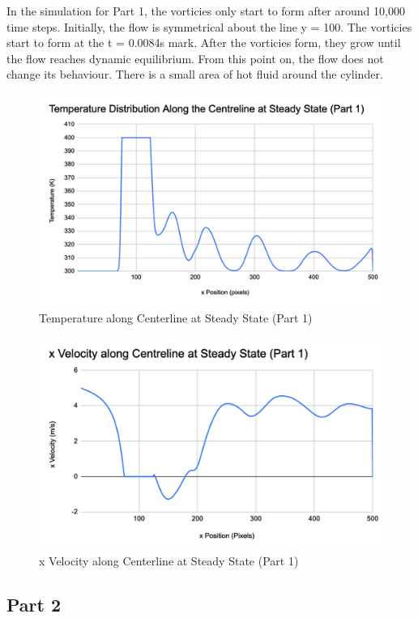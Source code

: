 In the simulation for Part 1, the vorticies only start to form after around 10,000 time steps. Initially, the flow is symmetrical about the line y = 100. The vorticies start to form at the t = 0.0084s mark. After the vorticies form, they grow until the flow reaches dynamic equilibrium. From this point on, the flow does not change its behaviour. There is a small area of hot fluid around the cylinder.  
\pagebreak

\begin{figure}[h]
\centering
\includegraphics[width=0.7\linewidth]{images/Temp-Part-1.png}
 \caption{Temperature along Centerline at Steady State (Part 1)}
\end{figure}
\begin{figure}[h]
\centering
\includegraphics[width=0.7\linewidth]{images/xVel-Part-1.png}
 \caption{x Velocity along Centerline at Steady State (Part 1)}
\end{figure}


\clearpage

\subsection{Part 2} 

